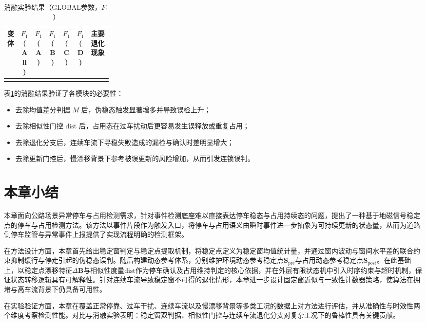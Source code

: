 \begin{table}[t]
    \centering
    \caption{消融实验结果（GLOBAL参数，$F_1$）}
    \label{tab:ch4_ablation}
    \begin{tabular}{lcccccp{0.25\linewidth}}
        \hline
        变体 & $F_1$(All) & $F_1$(A) & $F_1$(B) & $F_1$(C) & $F_1$(D) & 主要退化现象 \\
        \hline
        \\
        \hline
    \end{tabular}
\end{table}

表\ref{tab:ch4_ablation}的消融结果验证了各模块的必要性：
\begin{itemize}
    \item 去除均值差分判据 $M$ 后，伪稳态触发显著增多并导致误检上升；
    \item 去除相似性门控 $\mathrm{dist}$ 后，占用态在过车扰动后更容易发生误释放或重复占用；
    \item 去除退化分支后，连续车流下寻稳失败造成的漏检与确认时差明显增大；
    \item 去除更新门控后，慢漂移背景下参考被误更新的风险增加，从而引发连锁误判。
\end{itemize}

\section{本章小结}
\label{sec:ch4_summary}

本章面向公路场景异常停车与占用检测需求，针对事件检测底座难以直接表达停车稳态与占用持续态的问题，提出了一种基于地磁信号稳定点的停车与占用检测方法。该方法以事件片段作为触发入口，将停车与占用语义由瞬时事件进一步抽象为可持续更新的状态量，从而为道路侧停车监管与异常事件上报提供了实现流程明确的检测框架。

在方法设计方面，本章首先给出稳定窗判定与稳定点提取机制，将稳定点定义为稳定窗均值统计量，并通过窗内波动与窗间水平差的联合约束抑制缓行与停走引起的伪稳态误判。随后构建动态参考体系，分别维护环境动态参考稳定点$\mathbf{S}_{\mathrm{pre}}$与占用动态参考稳定点$\mathbf{S}_{\mathrm{post}}$。在此基础上，以稳定点漂移特征$\Delta\mathbf{B}$与相似性度量$\mathrm{dist}$作为停车确认及占用维持判定的核心依据，并在外层有限状态机中引入时序约束与超时机制，保证状态转移逻辑具有可解释性。针对连续车流导致稳定窗不可得的退化情形，本章进一步设计固定窗近似与一致性计数器策略，使算法在拥堵与高车流背景下仍具备可用性。

在实验验证方面，本章在覆盖正常停靠、过车干扰、连续车流以及慢漂移背景等多类工况的数据上对方法进行评估，并从准确性与时效性两个维度考察检测性能。对比与消融实验表明：稳定窗双判据、相似性门控与连续车流退化分支对复杂工况下的鲁棒性具有关键贡献。

